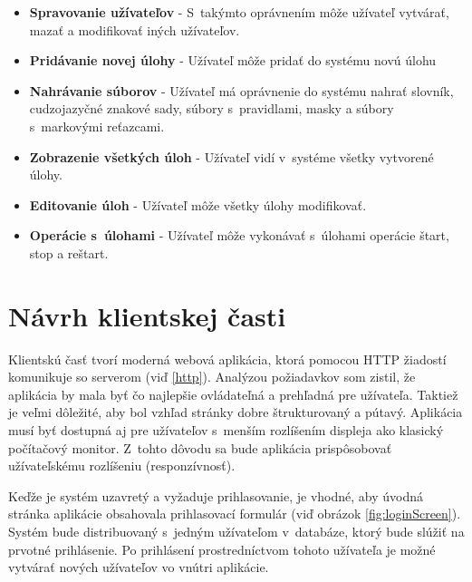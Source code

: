 \documentclass[slovak]{fitthesis}
\begin{document}
\begin{itemize}
    \item \textbf{Spravovanie užívateľov} - S~takýmto oprávnením môže užívateľ vytvárať, mazať a modifikovať iných užívateľov.
    \item \textbf{Pridávanie novej úlohy} - Užívateľ môže pridať do systému novú úlohu
    \item \textbf{Nahrávanie súborov} - Užívateľ má oprávnenie do systému nahrať slovník, cudzojazyčné znakové sady, súbory s~pravidlami, masky a súbory s~markovými reťazcami. 
    \item \textbf{Zobrazenie všetkých úloh} - Užívateľ vidí v~systéme všetky vytvorené úlohy.
    \item \textbf{Editovanie úloh} - Užívateľ môže všetky úlohy modifikovať.
    \item \textbf{Operácie s~úlohami} - Užívateľ môže vykonávať s~úlohami operácie štart, stop a reštart.
\end{itemize}





\section{Návrh klientskej časti}\label{navrhKlient}
Klientskú časť tvorí moderná webová aplikácia, ktorá pomocou HTTP žiadostí komunikuje so serverom (viď \ref{http}). Analýzou požiadavkov som zistil, že aplikácia by mala byť čo najlepšie ovládateľná a prehľadná pre užívateľa. Taktiež je veľmi dôležité, aby bol vzhľad stránky dobre štrukturovaný a pútavý. Aplikácia musí byť dostupná aj pre užívateľov s~menším rozlíšením displeja ako klasický počítačový monitor. Z~tohto dôvodu sa bude aplikácia prispôsobovať užívateľskému rozlíšeniu (responzívnosť).

Keďže je systém uzavretý a vyžaduje prihlasovanie, je vhodné, aby úvodná stránka aplikácie obsahovala prihlasovací formulár (viď obrázok \ref{fig:loginScreen}). Systém bude distribuovaný s~jedným užívateľom v~databáze, ktorý bude slúžiť na prvotné prihlásenie. Po prihlásení prostredníctvom tohoto užívateľa je možné vytvárať nových užívateľov vo vnútri aplikácie.
\end{document}
